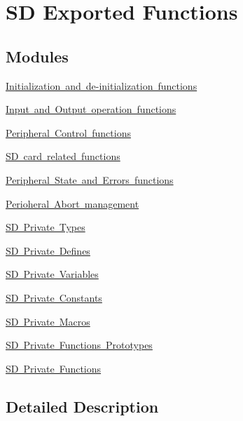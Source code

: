 \hypertarget{group___s_d___exported___functions}{}\section{SD Exported Functions}
\label{group___s_d___exported___functions}
\subsection*{Modules}
\begin{DoxyCompactItemize}
\item 
\mbox{\hyperlink{group___s_d___exported___functions___group1}{Initialization and de-\/initialization functions}}
\item 
\mbox{\hyperlink{group___s_d___exported___functions___group2}{Input and Output operation functions}}
\item 
\mbox{\hyperlink{group___s_d___exported___functions___group3}{Peripheral Control functions}}
\item 
\mbox{\hyperlink{group___s_d___exported___functions___group4}{S\+D card related functions}}
\item 
\mbox{\hyperlink{group___s_d___exported___functions___group5}{Peripheral State and Errors functions}}
\item 
\mbox{\hyperlink{group___s_d___exported___functions___group6}{Perioheral Abort management}}
\item 
\mbox{\hyperlink{group___s_d___private___types}{S\+D Private Types}}
\item 
\mbox{\hyperlink{group___s_d___private___defines}{S\+D Private Defines}}
\item 
\mbox{\hyperlink{group___s_d___private___variables}{S\+D Private Variables}}
\item 
\mbox{\hyperlink{group___s_d___private___constants}{S\+D Private Constants}}
\item 
\mbox{\hyperlink{group___s_d___private___macros}{S\+D Private Macros}}
\item 
\mbox{\hyperlink{group___s_d___private___functions___prototypes}{S\+D Private Functions Prototypes}}
\item 
\mbox{\hyperlink{group___s_d___private___functions}{S\+D Private Functions}}
\end{DoxyCompactItemize}


\subsection{Detailed Description}

